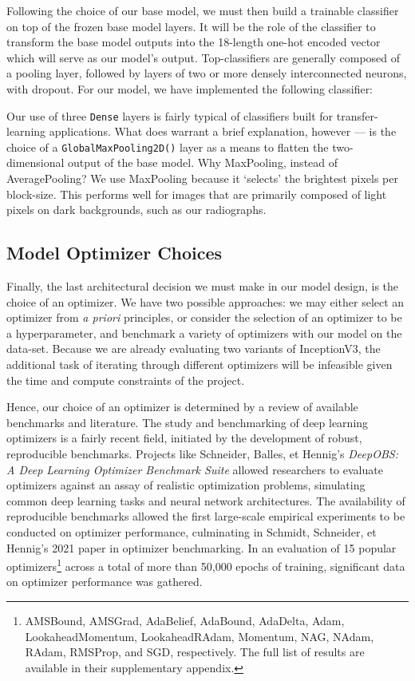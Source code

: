 Following the choice of our base model, we must then build a trainable classifier on top of the frozen base model layers. It will be the role of the classifier to transform the base model outputs into the 18-length one-hot encoded vector which will serve as our model's output. Top-classifiers are generally composed of a pooling layer, followed by layers of two or more densely interconnected neurons, with dropout. For our model, we have implemented the following classifier:



\noindent
Our use of three \texttt{Dense} layers is fairly typical of classifiers built for transfer-learning applications. What does warrant a brief explanation, however --- is the choice of a \texttt{GlobalMaxPooling2D()} layer as a means to flatten the two-dimensional output of the base model. Why MaxPooling, instead of AveragePooling? We use MaxPooling because it \enquote*{selects} the brightest pixels per block-size. This performs well for images that are primarily composed of light pixels on dark backgrounds, such as our radiographs.

\subsection{Model Optimizer Choices}

Finally, the last architectural decision we must make in our model design, is the choice of an optimizer. We have two possible approaches: we may either select an optimizer from \emph{a priori} principles, or consider the selection of an optimizer to be a hyperparameter, and benchmark a variety of optimizers with our model on the data-set. Because we are already evaluating two variants of InceptionV3, the additional task of iterating through different optimizers will be infeasible given the time and compute constraints of the project.

Hence, our choice of an optimizer is determined by a review of available benchmarks and literature. The study and benchmarking of deep learning optimizers is a fairly recent field, initiated by the development of robust, reproducible benchmarks. Projects like Schneider, Balles, et Hennig's \emph{DeepOBS: A Deep Learning Optimizer Benchmark Suite} allowed researchers to evaluate optimizers against an assay of realistic optimization problems, simulating common deep learning tasks and neural network architectures. \autocite{deepobs} The availability of reproducible benchmarks allowed the first large-scale empirical experiments to be conducted on optimizer performance, culminating in Schmidt, Schneider, et Hennig's 2021 paper in optimizer benchmarking. \autocite{crowdedvalley} In an evaluation of 15 popular optimizers\footnote{AMSBound, AMSGrad, AdaBelief, AdaBound, AdaDelta, Adam, LookaheadMomentum, LookaheadRAdam, Momentum, NAG, NAdam, RAdam, RMSProp, and SGD, respectively. The full list of results are available in their supplementary appendix.} across a total of more than 50,000 epochs of training, significant data on optimizer performance was gathered.

